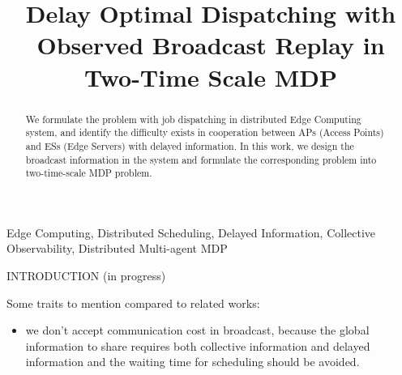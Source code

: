 \documentclass[10pt, conference, letterpaper]{IEEEtran}
\begin{document}
    \title{
        Delay Optimal Dispatching with Observed Broadcast Replay in Two-Time Scale MDP
    }
    \author{
    }
    \maketitle

    \begin{abstract}
        \label{sec:abstract}
        We formulate the problem with job dispatching in distributed Edge Computing system, and identify the difficulty exists in cooperation between APs (Access Points) and ESs (Edge Servers) with delayed information. In this work, we design the broadcast information in the system and formulate the corresponding problem into two-time-scale MDP problem.
    \end{abstract}

    \begin{IEEEkeywords}
        Edge Computing, Distributed Scheduling, Delayed Information, Collective Observability, Distributed Multi-agent MDP
    \end{IEEEkeywords}

    \begin{section}{INTRODUCTION}
        \label{sec:introduction}
        (in progress)

        Some traits to mention compared to related works:
        \begin{itemize}
            \item we don't accept communication cost in broadcast, because the global information to share requires both collective information and delayed information and the waiting time for scheduling should be avoided.
        \end{itemize}
    \end{section}
\end{document}
